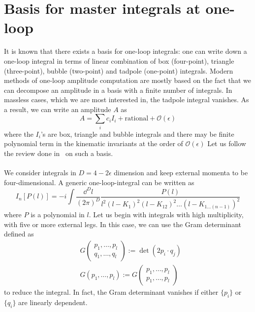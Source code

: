 \section{Basis for master integrals at one-loop} 
It is known that there exists a basis for one-loop integrals: one can write down a one-loop integral in terms of linear combination of box (four-point), triangle (three-point), bubble (two-point) and tadpole (one-point) integrals.
Modern methods of one-loop amplitude computation are mostly based on the fact that we can decompose an amplitude in a basis with a finite number of integrals.
In massless cases, which we are most interested in, the tadpole integral vanishes. 
As a result, we can write an amplitude $A$ as
\begin{equation}\label{master_equation}
A = \sum_i c_i I_i + \mathrm{rational} + \mathcal{O}(\epsilon)
\end{equation}
where the $I_i$'s are box, triangle and bubble integrals and there may be finite polynomial term in the kinematic invariants at the order of $\mathcal{O}(\epsilon)$
Let us follow the review done in~\cite{Gluza:2010ws} on such a basis.
\\\\
We consider integrals in $D= 4-2\epsilon$ dimension and keep external momenta to be four-dimensional.
A generic one-loop-integral can be written as
\begin{equation}\label{generic_loop_int}
I_n[P(l)] = 
-i\int\frac{\dd^D l}{(2\pi)^D}\frac{P(l)}{l^2(l-K_1)^2(l-K_{12})^2\ldots(l-K_{1\ldots (n-1)})^2}
\end{equation}
where $P$ is a polynomial in $l$.
Let us begin with integrals with high multiplicity, with five or more external legs.
In this case, we can use the Gram determinant defined as
\begin{equation*}
\begin{split}
& G\begin{pmatrix}
p_1,\ldots, p_l \\
q_1,\ldots, q_l 
\end{pmatrix}
:= \det(2p_i\cdot q_j)
\\
& G(p_1, \ldots , p_l) := G\begin{pmatrix}
p_1,\ldots, p_l \\
p_1,\ldots, p_l 
\end{pmatrix}
\end{split}
\end{equation*} 
to reduce the integral.
In fact, the Gram determinant vanishes if either $\{p_i\}$ or $\{q_i\}$ are linearly dependent.
